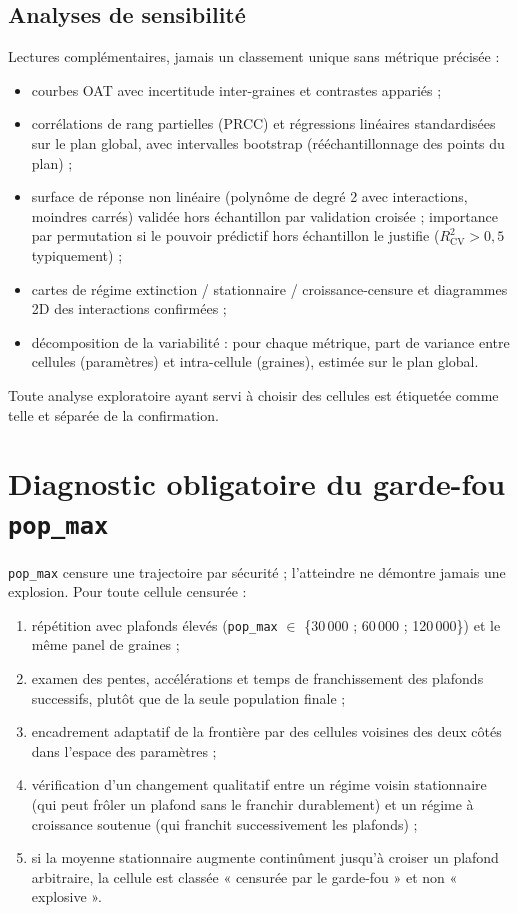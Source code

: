\documentclass[11pt,a4paper]{article}
\newcommand{\code}[1]{\texttt{#1}}
\begin{document}
\subsection{Analyses de sensibilité}

Lectures complémentaires, jamais un classement unique sans métrique
précisée :

\begin{itemize}
\item courbes OAT avec incertitude inter-graines et contrastes appariés ;
\item corrélations de rang partielles (PRCC) et régressions linéaires
  standardisées sur le plan global, avec intervalles bootstrap (rééchantillonnage
  des points du plan) ;
\item surface de réponse non linéaire (polynôme de degré 2 avec
  interactions, moindres carrés) validée hors échantillon par validation
  croisée ; importance par permutation si le pouvoir prédictif hors
  échantillon le justifie ($R^2_{\mathrm{CV}}>0{,}5$ typiquement) ;
\item cartes de régime extinction / stationnaire / croissance-censure et
  diagrammes 2D des interactions confirmées ;
\item décomposition de la variabilité : pour chaque métrique, part de
  variance entre cellules (paramètres) et intra-cellule (graines), estimée
  sur le plan global.
\end{itemize}

Toute analyse exploratoire ayant servi à choisir des cellules est
étiquetée comme telle et séparée de la confirmation.

\section{Diagnostic obligatoire du garde-fou \code{pop\_max}}
\label{sec:popmax}

\code{pop\_max} censure une trajectoire par sécurité ; l'atteindre ne
démontre jamais une explosion. Pour toute cellule censurée :

\begin{enumerate}
\item répétition avec plafonds élevés (\code{pop\_max} $\in$
  \{30\,000 ; 60\,000 ; 120\,000\}) et le même panel de graines ;
\item examen des pentes, accélérations et temps de franchissement des
  plafonds successifs, plutôt que de la seule population finale ;
\item encadrement adaptatif de la frontière par des cellules voisines des
  deux côtés dans l'espace des paramètres ;
\item vérification d'un changement qualitatif entre un régime voisin
  stationnaire (qui peut frôler un plafond sans le franchir durablement) et
  un régime à croissance soutenue (qui franchit successivement les
  plafonds) ;
\item si la moyenne stationnaire augmente continûment jusqu'à croiser un
  plafond arbitraire, la cellule est classée « censurée par le garde-fou »
  et non « explosive ».
\end{enumerate}
\end{document}
